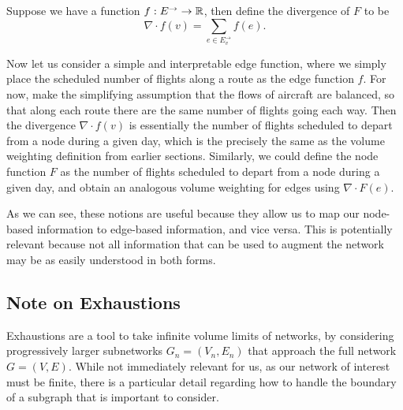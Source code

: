 \begin{definition}
    Suppose we have a function $f:E^\rightarrow\to\mathbb R$, then define the divergence of $F$ to be 
    \begin{equation}
        \nabla\cdot f(v) = \sum_{e\in E^\rightarrow_v} f(e).
    \end{equation}
\end{definition}

Now let us consider a simple and interpretable edge function, where we simply place the scheduled number of flights along a route as the edge function $f$. For now, make the simplifying assumption that the flows of aircraft are balanced, so that along each route there are the same number of flights going each way. Then the divergence $\nabla\cdot f(v)$ is essentially the number of flights scheduled to depart from a node during a given day, which is the precisely the same as the volume weighting definition from earlier sections. Similarly, we could define the node function $F$ as the number of flights scheduled to depart from a node during a given day, and obtain an analogous volume weighting for edges using $\nabla\cdot F(e)$.

As we can see, these notions are useful because they allow us to map our node-based information to edge-based information, and vice versa. This is potentially relevant because not all information that can be used to augment the network may be as easily understood in both forms.

\subsection{Note on Exhaustions}

Exhaustions are a tool to take infinite volume limits of networks, by considering progressively larger subnetworks $G_n=(V_n,E_n)$ that approach the full network $G=(V,E)$. While not immediately relevant for us, as our network of interest must be finite, there is a particular detail regarding how to handle the boundary of a subgraph that is important to consider.

